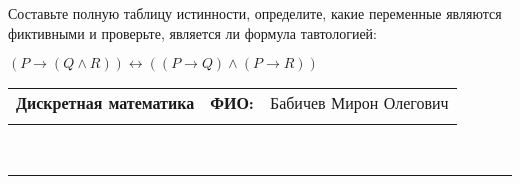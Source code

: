 \documentclass[10pt]{exam}
\newcommand{\class}{Дискретная математика}
\newcommand{\examdate}{}
\begin{document}
\begin{questions}
\begin{enumerate} [a)]
\end{enumerate}\question Составьте полную таблицу истинности, определите, какие переменные являются фиктивными и проверьте, является ли формула тавтологией:

$(P \rightarrow (Q \land R)) \leftrightarrow ((P \rightarrow Q) \land (P \rightarrow R))$

\end{questions}
\newpage
\begin{flushright}
\begin{tabular}{p{2.8in} r l}
\textbf{\class} & \textbf{ФИО:} &Бабичев Мирон Олегович
\\

\textbf{\examdate} &&\\
\end{tabular}\\
\end{flushright}
\rule[1ex]{\textwidth}{.1pt}
\end{document}

